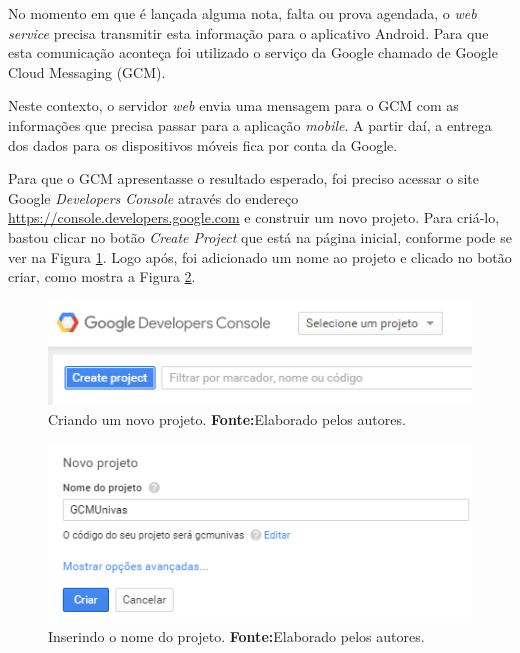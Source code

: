 
	\par No momento em que é lançada alguma nota, falta ou prova agendada, o
\textit{web service} precisa transmitir esta informação para o aplicativo
Android. Para que esta comunicação aconteça foi utilizado o serviço da Google
chamado de Google Cloud Messaging (GCM).

	\par Neste contexto, o servidor \textit{web} envia uma mensagem para o GCM com
as informações que precisa passar para a aplicação \textit{mobile}. A partir
daí, a entrega dos dados para os dispositivos móveis fica por conta da Google.

	\par Para que o GCM apresentasse o resultado esperado, foi preciso acessar o
site Google \textit{Developers Console} através do endereço
\url{https://console.developers.google.com} e construir um novo projeto. Para
criá-lo, bastou clicar no botão \textit{Create Project} que está na página
inicial, conforme pode se ver na Figura \ref{fig:gcm}. Logo após, foi
adicionado um nome ao projeto e clicado no botão criar, como mostra a Figura
\ref{fig:gcm1}.

	
	\begin{figure}[h!] 
		\centerline{\includegraphics[scale=0.6]{./imagens/2_q_metodologico/4_procedimentos_resultados/41_gcm/gcm.png}}
		\caption[Criando um novo projeto]{Criando um novo projeto.
		\textbf{Fonte:}Elaborado pelos autores.}
		\label{fig:gcm}
	\end{figure}
	
	\begin{figure}[h!] 
		\centerline{\includegraphics[scale=0.7]{./imagens/2_q_metodologico/4_procedimentos_resultados/41_gcm/gcm1.png}}
		\caption[Inserindo o nome do projeto]{Inserindo o nome do projeto.
		\textbf{Fonte:}Elaborado pelos autores.}
		\label{fig:gcm1}
	\end{figure}
	
